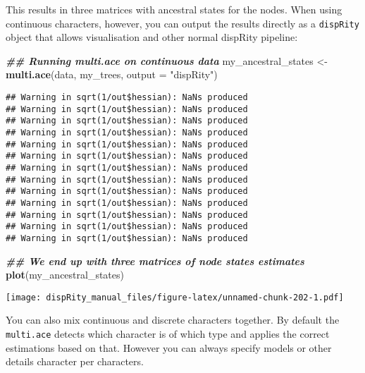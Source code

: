 \documentclass[
]{book}
\newenvironment{Shaded}{\begin{snugshade}}{\end{snugshade}}
\newcommand{\AttributeTok}[1]{\textcolor[rgb]{0.13,0.29,0.53}{#1}}
\newcommand{\DocumentationTok}[1]{\textcolor[rgb]{0.56,0.35,0.01}{\textbf{\textit{#1}}}}
\newcommand{\FunctionTok}[1]{\textcolor[rgb]{0.13,0.29,0.53}{\textbf{#1}}}
\newcommand{\NormalTok}[1]{#1}
\newcommand{\OtherTok}[1]{\textcolor[rgb]{0.56,0.35,0.01}{#1}}
\newcommand{\StringTok}[1]{\textcolor[rgb]{0.31,0.60,0.02}{#1}}
\begin{document}
This results in three matrices with ancestral states for the nodes.
When using continuous characters, however, you can output the results directly as a \texttt{dispRity} object that allows visualisation and other normal dispRity pipeline:

\begin{Shaded}
\begin{Highlighting}[]
\DocumentationTok{\#\# Running multi.ace on continuous data}
\NormalTok{my\_ancestral\_states }\OtherTok{\textless{}{-}} \FunctionTok{multi.ace}\NormalTok{(data, my\_trees, }\AttributeTok{output =} \StringTok{"dispRity"}\NormalTok{)}
\end{Highlighting}
\end{Shaded}

\begin{verbatim}
## Warning in sqrt(1/out$hessian): NaNs produced
## Warning in sqrt(1/out$hessian): NaNs produced
## Warning in sqrt(1/out$hessian): NaNs produced
## Warning in sqrt(1/out$hessian): NaNs produced
## Warning in sqrt(1/out$hessian): NaNs produced
## Warning in sqrt(1/out$hessian): NaNs produced
## Warning in sqrt(1/out$hessian): NaNs produced
## Warning in sqrt(1/out$hessian): NaNs produced
## Warning in sqrt(1/out$hessian): NaNs produced
## Warning in sqrt(1/out$hessian): NaNs produced
## Warning in sqrt(1/out$hessian): NaNs produced
## Warning in sqrt(1/out$hessian): NaNs produced
## Warning in sqrt(1/out$hessian): NaNs produced
\end{verbatim}

\begin{Shaded}
\begin{Highlighting}[]
\DocumentationTok{\#\# We end up with three matrices of node states estimates}
\FunctionTok{plot}\NormalTok{(my\_ancestral\_states)}
\end{Highlighting}
\end{Shaded}

\texttt{[image: dispRity\_manual\_files/figure-latex/unnamed-chunk-202-1.pdf]}

You can also mix continuous and discrete characters together.
By default the \texttt{multi.ace} detects which character is of which type and applies the correct estimations based on that.
However you can always specify models or other details character per characters.
\end{document}
